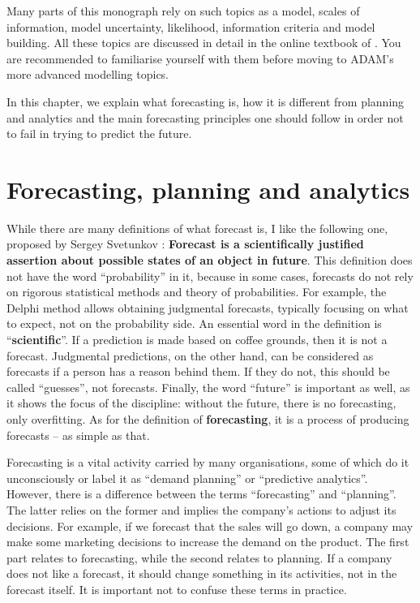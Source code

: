 \documentclass[
]{book}
\theoremstyle{definition}
\theoremstyle{definition}
\theoremstyle{definition}
\theoremstyle{definition}
\theoremstyle{remark}
\begin{document}
Many parts of this monograph rely on such topics as a model, scales of information, model uncertainty, likelihood, information criteria and model building. All these topics are discussed in detail in the online textbook of \citet{SvetunkovSBA}. You are recommended to familiarise yourself with them before moving to ADAM's more advanced modelling topics.

In this chapter, we explain what forecasting is, how it is different from planning and analytics and the main forecasting principles one should follow in order not to fail in trying to predict the future.

\hypertarget{forecastingPlanningAnalytics}{%
\section{Forecasting, planning and analytics}\label{forecastingPlanningAnalytics}}

While there are many definitions of what forecast is, I like the following one, proposed by Sergey Svetunkov \citep{Svetunkov2014Textbook}: \textbf{Forecast is a scientifically justified assertion about possible states of an object in future}. This definition does not have the word ``probability'' in it, because in some cases, forecasts do not rely on rigorous statistical methods and theory of probabilities. For example, the Delphi method allows obtaining judgmental forecasts, typically focusing on what to expect, not on the probability side. An essential word in the definition is ``\textbf{scientific}''. If a prediction is made based on coffee grounds, then it is not a forecast. Judgmental predictions, on the other hand, can be considered as forecasts if a person has a reason behind them. If they do not, this should be called ``guesses'', not forecasts. Finally, the word ``future'' is important as well, as it shows the focus of the discipline: without the future, there is no forecasting, only overfitting. As for the definition of \textbf{forecasting}, it is a process of producing forecasts -- as simple as that.

Forecasting is a vital activity carried by many organisations, some of which do it unconsciously or label it as ``demand planning'' or ``predictive analytics''. However, there is a difference between the terms ``forecasting'' and ``planning''. The latter relies on the former and implies the company's actions to adjust its decisions. For example, if we forecast that the sales will go down, a company may make some marketing decisions to increase the demand on the product. The first part relates to forecasting, while the second relates to planning. If a company does not like a forecast, it should change something in its activities, not in the forecast itself. It is important not to confuse these terms in practice.
\end{document}
